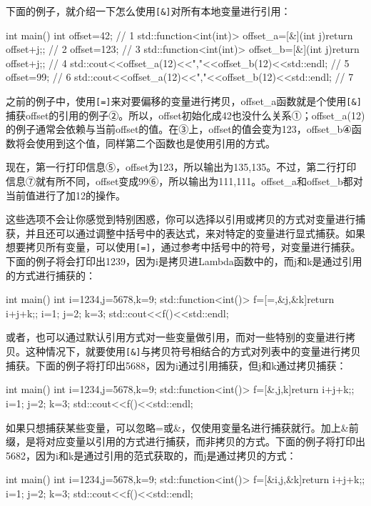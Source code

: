 下面的例子，就介绍一下怎么使用\texttt{[\&]}对所有本地变量进行引用：

\begin{cpp}
int main()
{
  int offset=42;  // 1
  std::function<int(int)> offset_a=[&](int j){return offset+j;};  // 2
  offset=123;  // 3
  std::function<int(int)> offset_b=[&](int j){return offset+j;};  // 4
  std::cout<<offset_a(12)<<","<<offset_b(12)<<std::endl;  // 5
  offset=99;  // 6
  std::cout<<offset_a(12)<<","<<offset_b(12)<<std::endl;  // 7
}
\end{cpp}

之前的例子中，使用\texttt{[=]}来对要偏移的变量进行拷贝，offset\_a函数就是个使用\texttt{[\&]}捕获offset的引用的例子②。所以，offset初始化成42也没什么关系①；offset\_a(12)的例子通常会依赖与当前offset的值。在③上，offset的值会变为123，offset\_b④函数将会使用到这个值，同样第二个函数也是使用引用的方式。

现在，第一行打印信息⑤，offset为123，所以输出为135,135。不过，第二行打印信息⑦就有所不同，offset变成99⑥，所以输出为111,111。offset\_a和offset\_b都对当前值进行了加12的操作。

这些选项不会让你感觉到特别困惑，你可以选择以引用或拷贝的方式对变量进行捕获，并且还可以通过调整中括号中的表达式，来对特定的变量进行显式捕获。如果想要拷贝所有变量，可以使用\texttt{[=]}，通过参考中括号中的符号，对变量进行捕获。下面的例子将会打印出1239，因为i是拷贝进Lambda函数中的，而j和k是通过引用的方式进行捕获的：

\begin{cpp}
int main()
{
  int i=1234,j=5678,k=9;
  std::function<int()> f=[=,&j,&k]{return i+j+k;};
  i=1;
  j=2;
  k=3;
  std::cout<<f()<<std::endl;
}
\end{cpp}

或者，也可以通过默认引用方式对一些变量做引用，而对一些特别的变量进行拷贝。这种情况下，就要使用\texttt{[\&]}与拷贝符号相结合的方式对列表中的变量进行拷贝捕获。下面的例子将打印出5688，因为i通过引用捕获，但j和k通过拷贝捕获：

\begin{cpp}
int main()
{
  int i=1234,j=5678,k=9;
  std::function<int()> f=[&,j,k]{return i+j+k;};
  i=1;
  j=2;
  k=3;
  std::cout<<f()<<std::endl;
}
\end{cpp}

如果只想捕获某些变量，可以忽略=或\&，仅使用变量名进行捕获就行。加上\&前缀，是将对应变量以引用的方式进行捕获，而非拷贝的方式。下面的例子将打印出5682，因为i和k是通过引用的范式获取的，而j是通过拷贝的方式：

\begin{cpp}
int main()
{
  int i=1234,j=5678,k=9;
  std::function<int()> f=[&i,j,&k]{return i+j+k;};
  i=1;
  j=2;
  k=3;
  std::cout<<f()<<std::endl;
}
\end{cpp}

